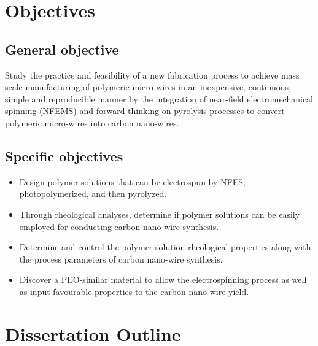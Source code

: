 \section{Objectives}

\subsection{General objective}
Study the practice and feasibility of a new fabrication process to achieve mass scale manufacturing of polymeric micro-wires in an inexpensive, continuous, simple and reproducible manner by the integration of near-field electromechanical spinning (NFEMS) and forward-thinking on pyrolysis processes to convert polymeric micro-wires into carbon nano-wires.

\subsection{Specific objectives}

\begin{itemize}
	\item{
	Design polymer solutions that can be electrospun by NFES, photopolymerized, and then pyrolyzed.
    }
    \item{
    Through rheological analyses, determine if polymer solutions can be easily employed for conducting carbon nano-wire synthesis.
    }
    \item{
    Determine and control the polymer solution rheological properties along with the process parameters of carbon nano-wire synthesis.
    }
    \item{
    Discover a PEO-similar material to allow the electrospinning process as well as input favourable properties to the carbon nano-wire yield.
    }
\end{itemize}

\section{Dissertation Outline}


